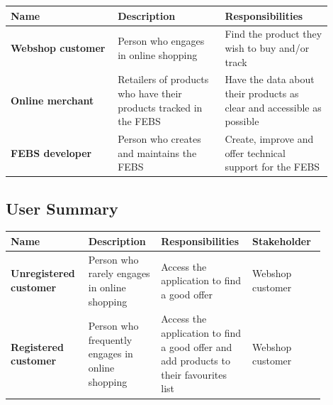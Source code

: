\documentclass[12pt,a4paper,twoside]{report}
\begin{document}
\begin{table}[H]
  \centering
  \begin{tabular}{| m{0.3\linewidth} | m{0.3\linewidth} | m{0.3\linewidth} |}
    \hline
    \rowcolor{lightgray} Name & Description                                                       & Responsibilities                                                       \\
    \hline
    \textbf{Webshop customer} & Person who engages in online shopping                             & Find the product they wish to buy and/or track                         \\
    \hline
    \textbf{Online merchant}  & Retailers of products who have their products tracked in the FEBS & Have the data about their products as clear and accessible as possible \\
    \hline
    \textbf{FEBS developer}   & Person who creates and maintains the FEBS                         & Create, improve and offer technical support for the FEBS               \\
    \hline
  \end{tabular}
  \label{table:stakeholder_summary}
\end{table}


\subsection{User Summary}

\begin{table}[H]
  \centering
  \begin{tabular}{| m{0.22\linewidth} | m{0.22\linewidth} | m{0.22\linewidth} | m{0.22\linewidth} |}
    \hline
    \rowcolor{lightgray} Name      & Description                                      & Responsibilities                                                                      & Stakeholder      \\
    \hline
    \textbf{Unregistered customer} & Person who rarely engages in online shopping     & Access the application to find a good offer                                           & Webshop customer \\
    \hline
    \textbf{Registered customer}   & Person who frequently engages in online shopping & Access the application to find a good offer and add products to their favourites list & Webshop customer \\
    \hline
  \end{tabular}
  \label{table:user_summary}
\end{table}
\end{document}
